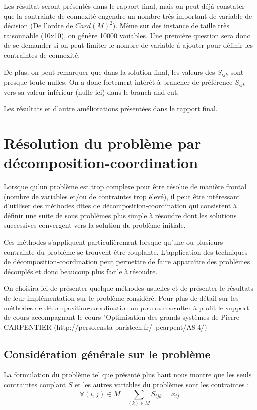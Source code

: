 \documentclass[a4paper,11pt] {article}
\begin{document}
Les résultat seront présentés dans le rapport final, mais on peut déjà constater que la contrainte de connexité engendre un nombre très important de variable de décision (De l'ordre de $Card(M)^2$). Même sur des instance de taille très raisonnable (10x10), on génère 10000 variables. Une première question sera donc de se demander si on peut limiter le nombre de variable à ajouter pour définir les contraintes de connexité.

De plus, on peut remarquer que dans la solution final, les valeurs des $S_{ijk}$ sont presque toute nulles. On a donc fortement intérêt à brancher de préférence $S_{ijk}$ vers sa valeur inférieur (nulle ici) dans le branch and cut.

Les résultats et d'autre améliorations présentées dans le rapport final.

\section{Résolution du problème par décomposition-coordination}

Lorsque qu'un problème est trop complexe pour être résolue de manière frontal (nombre de variables et/ou de contraintes trop élevé), il peut être intéressant d'utiliser des méthodes dites de décomposition-coordination qui consistent à définir une suite de sous problèmes plus simple à résoudre dont les solutions successives convergent vers la solution du problème initiale.

Ces méthodes s'appliquent particulièrement lorsque qu'une ou plusieurs contrainte du problème se trouvent être couplante. L'application des techniques de décomposition-coordination peut permettre de faire apparaître des problèmes découplés et donc beaucoup plus facile à résoudre. 

On choisira ici de présenter quelque méthodes usuelles et de présenter le résultats de leur implémentation sur le problème considéré. Pour plus de détail sur les méthodes de décomposition-coordination on pourra consulter à profit le support de cours accompagnant le cours "Optimisation des grands systèmes de Pierre CARPENTIER (http://perso.ensta-paristech.fr/~pcarpent/A8-4/)

\subsection{Considération générale sur le problème}

La formulation du problème tel que présenté plus haut nous montre que les seuls contraintes couplant $S$ et les autres variables du problèmes sont les contraintes : 
\begin{equation}
\forall{(i,j)} \in M \quad \sum\limits_{(k)\in M} S_{ijk} = x_{ij}
\end{equation}
\end{document}
